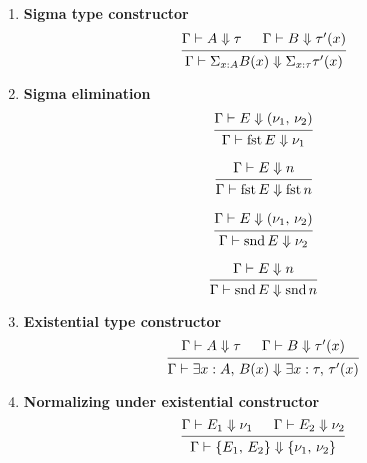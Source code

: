\documentclass{article}
\begin{document}
\begin{enumerate}
  \item \textbf{Sigma type constructor} \\
    \[
      \begin{prooftree}
        \hypo{\Gamma \vdash A \Downarrow \tau}
        \hypo{\Gamma \vdash B \Downarrow \tau'(x)}
        \infer2{\Gamma \vdash \Sigma_{x : A}B(x) \Downarrow \Sigma_{x : \tau}\tau'(x)}
      \end{prooftree}
    \]

  \item \textbf{Sigma elimination} \\
   \[
    \begin{prooftree}
      \hypo{\Gamma \vdash E \Downarrow (\nu_1, \, \nu_2)}
      \infer1{\Gamma \vdash \fst E \Downarrow \nu_1}
    \end{prooftree}
  \]

  \[
   \begin{prooftree}
    \hypo{\Gamma \vdash E \Downarrow n}
     \infer1{\Gamma \vdash \fst E \Downarrow \fst n}
   \end{prooftree}
  \]

  \[
    \begin{prooftree}
      \hypo{\Gamma \vdash E \Downarrow (\nu_1, \, \nu_2)}
      \infer1{\Gamma \vdash \snd E \Downarrow \nu_2}
    \end{prooftree}
  \]

  \[
   \begin{prooftree}
     \hypo{\Gamma \vdash E \Downarrow n}
     \infer1{\Gamma \vdash \snd E \Downarrow \snd n}
   \end{prooftree}
  \]

  \item \textbf{Existential type constructor} \\
    \[
      \begin{prooftree}
        \hypo{\Gamma \vdash A \Downarrow \tau}
        \hypo{\Gamma \vdash B \Downarrow \tau'(x)}
        \infer2{\Gamma \vdash \exists x : A, \, B(x) \Downarrow \exists x : \tau, \, \tau'(x)}
      \end{prooftree}
    \]

  \item \textbf{Normalizing under existential constructor} \\
   \[
      \begin{prooftree}
        \hypo{\Gamma \vdash E_1 \Downarrow \nu_1}
        \hypo{\Gamma \vdash E_2 \Downarrow \nu_2}
        \infer2{\Gamma \vdash \{E_1, \, E_2\} \Downarrow \{\nu_1, \, \nu_2\}}
      \end{prooftree}
    \]
  

\end{enumerate}
\end{document}
